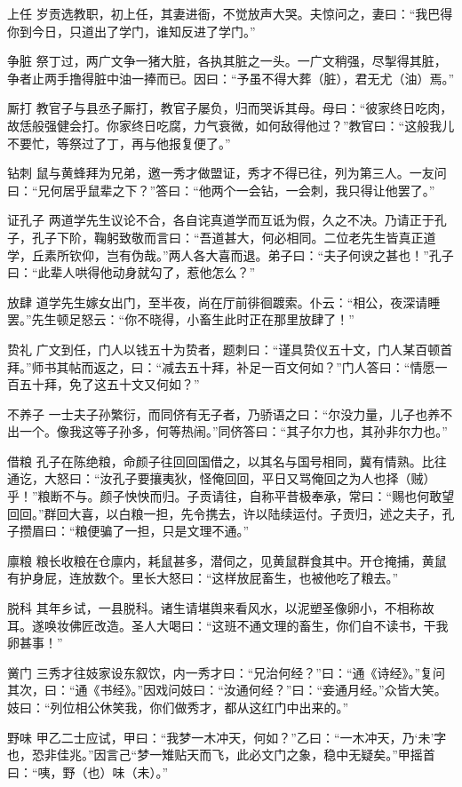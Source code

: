 \documentclass[12pt,UTF8]{ctexbook}
\begin{document}
上任
岁贡选教职，初上任，其妻进衙，不觉放声大哭。夫惊问之，妻曰：“我巴得你到今日，只道出了学门，谁知反进了学门。”

争脏
祭丁过，两广文争一猪大脏，各执其脏之一头。一广文稍强，尽掣得其脏，争者止两手撸得脏中油一捧而已。因曰：“予虽不得大葬（脏），君无尤（油）焉。”

厮打
教官子与县丞子厮打，教官子屡负，归而哭诉其母。母曰：“彼家终日吃肉，故恁般强健会打。你家终日吃腐，力气衰微，如何敌得他过？”教官曰：“这般我儿不要忙，等祭过了丁，再与他报复便了。”

钻刺
鼠与黄蜂拜为兄弟，邀一秀才做盟证，秀才不得已往，列为第三人。一友问曰：“兄何居乎鼠辈之下？”答曰：“他两个一会钻，一会刺，我只得让他罢了。”

证孔子
两道学先生议论不合，各自诧真道学而互诋为假，久之不决。乃请正于孔子，孔子下阶，鞠躬致敬而言曰：“吾道甚大，何必相同。二位老先生皆真正道学，丘素所钦仰，岂有伪哉。”两人各大喜而退。弟子曰：“夫子何谀之甚也！”孔子曰：“此辈人哄得他动身就勾了，惹他怎么？”

放肆
道学先生嫁女出门，至半夜，尚在厅前徘徊踱索。仆云：“相公，夜深请睡罢。”先生顿足怒云：“你不晓得，小畜生此时正在那里放肆了！”

贽礼
广文到任，门人以钱五十为贽者，题刺曰：“谨具贽仪五十文，门人某百顿首拜。”师书其帖而返之，曰：“减去五十拜，补足一百文何如？”门人答曰：“情愿一百五十拜，免了这五十文又何如？”

不养子
一士夫子孙繁衍，而同侪有无子者，乃骄语之曰：“尔没力量，儿子也养不出一个。像我这等子孙多，何等热闹。”同侪答曰：“其子尔力也，其孙非尔力也。”

借粮
孔子在陈绝粮，命颜子往回回国借之，以其名与国号相同，冀有情熟。比往通讫，大怒曰：“汝孔子要攘夷狄，怪俺回回，平日又骂俺回之为人也择（贼）乎！”粮断不与。颜子怏怏而归。子贡请往，自称平昔极奉承，常曰：“赐也何敢望回回。”群回大喜，以白粮一担，先令携去，许以陆续运付。子贡归，述之夫子，孔子攒眉曰：“粮便骗了一担，只是文理不通。”

廪粮
粮长收粮在仓廪内，耗鼠甚多，潜伺之，见黄鼠群食其中。开仓掩捕，黄鼠有护身屁，连放数个。里长大怒曰：“这样放屁畜生，也被他吃了粮去。”

脱科
其年乡试，一县脱科。诸生请堪舆来看风水，以泥塑圣像卵小，不相称故耳。遂唤妆佛匠改造。圣人大喝曰：“这班不通文理的畜生，你们自不读书，干我卵甚事！”

黉门
三秀才往妓家设东叙饮，内一秀才曰：“兄治何经？”曰：“通《诗经》。”复问其次，曰：“通《书经》。”因戏问妓曰：“汝通何经？”曰：“妾通月经。”众皆大笑。妓曰：“列位相公休笑我，你们做秀才，都从这红门中出来的。”

野味
甲乙二士应试，甲曰：“我梦一木冲天，何如？”乙曰：“一木冲天，乃‘未’字也，恐非佳兆。”因言己“梦一雉贴天而飞，此必文门之象，稳中无疑矣。”甲摇首曰：“咦，野（也）味（未）。”
\end{document}
